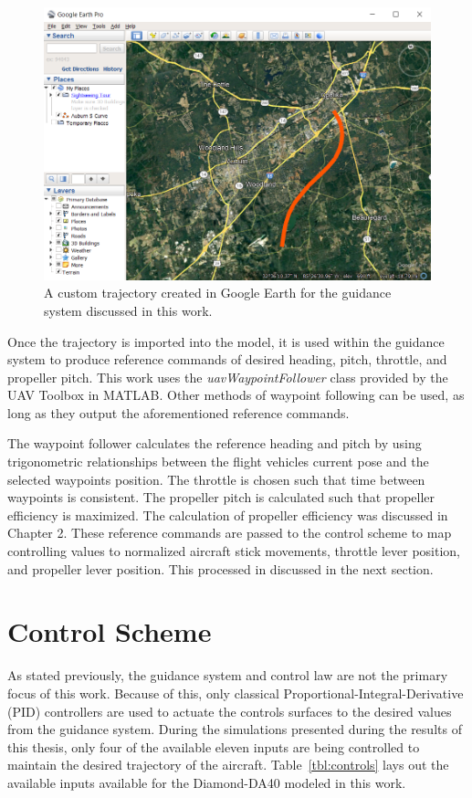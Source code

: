 \begin{figure}[!ht]
    \centering
    \includegraphics[width=0.75\linewidth]{Figures/auburnScurve.png}
    \caption{A custom trajectory created in Google Earth for the guidance system discussed in this work.}\label{fig:googleEarth}
\end{figure}

Once the trajectory is imported into the model, it is used within the guidance system to produce reference commands of desired heading, pitch, throttle, and propeller pitch. This work uses the \textit{uavWaypointFollower} class provided by the UAV Toolbox in MATLAB\@. Other methods of waypoint following can be used, as long as they output the aforementioned reference commands.

The waypoint follower calculates the reference heading and pitch by using trigonometric relationships between the flight vehicles current pose and the selected waypoints position. The throttle is chosen such that time between waypoints is consistent. The propeller pitch is calculated such that propeller efficiency is maximized. The calculation of propeller efficiency was discussed in Chapter 2. These reference commands are passed to the control scheme to map controlling values to normalized aircraft stick movements, throttle lever position, and propeller lever position. This processed in discussed in the next section.

\section{\textbf{Control Scheme}}

As stated previously, the guidance system and control law are not the primary focus of this work. Because of this, only classical Proportional-Integral-Derivative (PID) controllers are used to actuate the controls surfaces to the desired values from the guidance system. During the simulations presented during the results of this thesis, only four of the available eleven inputs are being controlled to maintain the desired trajectory of the aircraft. Table~\ref{tbl:controls} lays out the available inputs available for the Diamond-DA40 modeled in this work.

